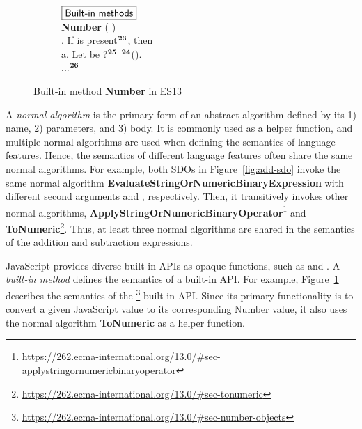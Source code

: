 \begin{figure}
  \centering
  \begin{subfigure}{\textwidth}
    \small
    $\fbox{\textsf{Built-in methods}}$
    \vspace*{0.5em}\\
    \textbf{Number} (  )
    \\
    \null{}. If  is present${}^{\textbf{23}}$, then
    \\
    \null\quad\quad a. Let  be ?${}^{\textbf{25}}$
    ${}^{\textbf{24}}$().
    \\
    \null\quad ...${}^{\textbf{26}}$
  \end{subfigure}
\vspace*{-1.5em}
  \caption{
    Built-in method \textbf{Number} in ES13
  }
  \label{fig:builtin-number}
  \vspace*{-1em}
\end{figure}

A \textit{normal algorithm} is the primary form of an abstract algorithm defined
by its 1) name, 2) parameters, and 3) body.
It is commonly used as a helper function, and multiple normal algorithms are
used when defining the semantics of language features.
Hence, the semantics of different language features often share the same normal
algorithms.
For example, both SDOs in Figure~\ref{fig:add-sdo} invoke the same normal
algorithm \textbf{EvaluateStringOrNumericBinaryExpression} with different second
arguments \escode{+} and \escode{-}, respectively.
Then, it transitively invokes other normal algorithms,
\textbf{ApplyStringOrNumericBinaryOperator}\footnote{
\url{https://262.ecma-international.org/13.0/\#sec-applystringornumericbinaryoperator}
} and \textbf{ToNumeric}\footnote{
\url{https://262.ecma-international.org/13.0/\#sec-tonumeric}
}.
Thus, at least three normal algorithms are shared in the semantics of the
addition and subtraction expressions.


JavaScript provides diverse built-in APIs as opaque functions, such as
 and .
A \textit{built-in method} defines the semantics of a built-in API.
For example, Figure~\ref{fig:builtin-number} describes the semantics of the
\footnote{
\url{https://262.ecma-international.org/13.0/\#sec-number-objects}
} built-in API.
Since its primary functionality is to convert a given JavaScript value to its
corresponding Number value, it also uses the normal algorithm \textbf{ToNumeric}
as a helper function.

